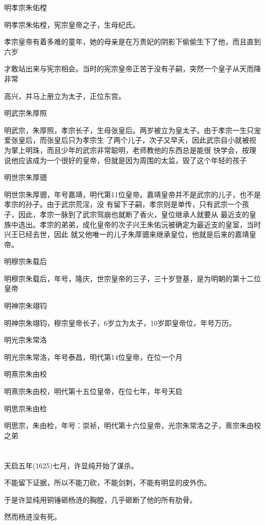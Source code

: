 \documentclass[11pt,a4paper,onecolumn]{article}
\begin{document}
明孝宗朱佑樘

明孝宗朱佑樘，宪宗皇帝之子，生母纪氏。

孝宗皇帝有着多难的童年，她的母亲是在万贵妃的阴影下偷偷生下了他，而且直到六岁

才敢站出来与宪宗相会。当时的宪宗皇帝正苦于没有子嗣，突然一个皇子从天而降非常

高兴，并马上册立为太子，正位东宫。

明武宗朱厚照

明武宗，朱厚照，孝宗长子，生母张皇后。两岁被立为皇太子。由于孝宗一生只宠爱张皇后，而张皇后只为孝宗生
了两个儿子，次子又早夭，因此武宗自小就被视为掌上明珠，而且少年的武宗非常聪明，老师教他的东西总是能很
快学会，按理说他应该成为一个很好的皇帝，但就是因为周围的太监，毁了这个年轻的孩子

明世宗朱厚骢

明世宗朱厚骢，年号嘉靖，明代第11位皇帝。嘉靖皇帝并不是武宗的儿子，也不是孝宗的孙子。由于武宗荒淫，没
有留下子嗣，孝宗则是单传，只有武宗一个孩子，因此，孝宗一脉到了武宗驾崩也就断了香火，皇位继承人就要从
最近支的皇族中选出。孝宗的弟弟，成化皇帝的次子兴王朱佑沅被确定为最近支的皇室，当时兴王已经去世，因此
就又他唯一的儿子朱厚骢来继承皇位，他就是后来的嘉靖皇帝。

明穆宗朱载后

明穆宗朱载后，年号，隆庆，世宗皇帝的三子，三十岁登基，是为明朝的第十二位皇帝

明神宗朱翊钧

明神宗朱翊钧，穆宗皇帝长子，6岁立为太子，10岁即皇帝位，年号万历。

明光宗朱常洛

明光宗朱常洛，年号泰昌，明代第14位皇帝，在位一个月

明熹宗朱由校

明熹宗朱由校，明代第十五位皇帝，在位七年，年号天启

明思宗朱由检

明思宗，朱由检，年号：崇祯，明代第十六位皇帝，光宗朱常洛之子，熹宗朱由校之弟

\section[\thesection]{}

天启五年(1625)七月，许显纯开始了谋杀。

不能留下证据，所以不能刀砍，不能剑刺，不能有明显的皮外伤。

于是许显纯用铜锤砸杨涟的胸膛，几乎砸断了他的所有肋骨。

然而杨涟没有死。
\end{document}
